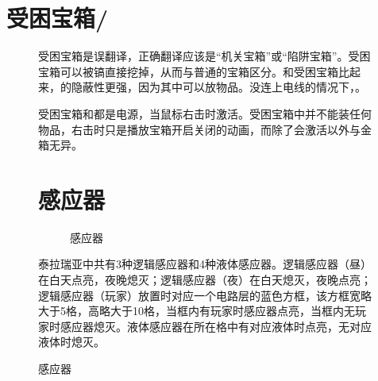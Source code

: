 \section{受困宝箱/\DMC}
\begin{figure}[!ht]
\centering
{}
\qquad
{}
受困宝箱是误翻译，正确翻译应该是“机关宝箱”或“陷阱宝箱”。受困宝箱可以被镐直接挖掉，从而与普通的宝箱区分。和受困宝箱比起来，\DMC 的隐蔽性更强，因为其中可以放物品。没连上电线的情况下，。

受困宝箱和\DMC 都是电源，当鼠标右击时激活。受困宝箱中并不能装任何物品，右击时只是播放宝箱开启关闭的动画，而\DMC 除了会激活以外与金箱无异。

\section{感应器}
\begin{figure}[!ht]
\centering
{}
\qquad
{}
\qquad
{}
\caption{感应器}
\end{figure}
泰拉瑞亚中共有3种逻辑感应器和4种液体感应器。逻辑感应器（昼）在白天点亮，夜晚熄灭；逻辑感应器（夜）在白天熄灭，夜晚点亮；逻辑感应器（玩家）放置时对应一个电路层的蓝色方框，该方框宽略大于5格，高略大于10格，当框内有玩家时感应器点亮，当框内无玩家时感应器熄灭。液体感应器在所在格中有对应液体时点亮，无对应液体时熄灭。


\end{figure}
